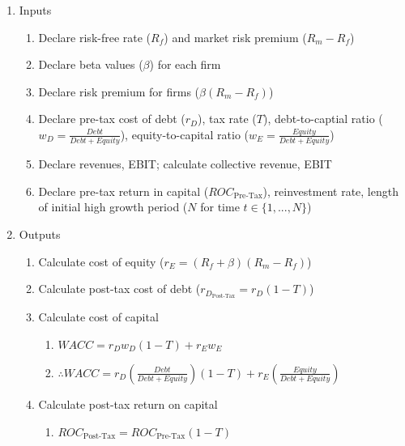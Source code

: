 \documentclass[11pt, english]{article}
\begin{document}
	\begin{enumerate}
	\setlength\itemsep{0cm}
                \item Inputs
                \begin{enumerate}
                        \item Declare risk-free rate ($R_f$) and market risk premium ($R_m-R_f$)
                        \item Declare beta values ($\beta$) for each firm
                        \item Declare risk premium for firms ($\beta(R_m-R_f)$)
                        \item Declare pre-tax cost of debt ($r_D$), tax rate ($T$), debt-to-captial ratio ($w_D=\frac{Debt}{Debt+Equity}$), equity-to-capital ratio ($w_E=\frac{Equity}{Debt+Equity}$)
                        \item Declare revenues, EBIT; calculate collective revenue, EBIT
                        \item Declare pre-tax return in capital ($ROC_{\textrm{Pre-Tax}}$), reinvestment rate, length of initial high growth period ($N$ for time $t\in\{1,...,N\}$)
                \end{enumerate}
                \item Outputs
                \begin{enumerate}
                        \item Calculate cost of equity ($r_E=(R_f+\beta)(R_m-R_f)$)
                        \item Calculate post-tax cost of debt ($r_{D_{\textrm{Post-Tax}}}=r_D(1-T)$)
                        \item Calculate cost of capital
                        \begin{enumerate}
                                \item $WACC=r_Dw_D(1-T)+r_Ew_E$
                                \item $\therefore WACC=r_D\left(\frac{Debt}{Debt+Equity}\right)(1-T)+r_E\left(\frac{Equity}{Debt+Equity}\right)$
                        \end{enumerate}
                        \item Calculate post-tax return on capital
                        \begin{enumerate}
                                \item $ROC_{\textrm{Post-Tax}}=ROC_{\textrm{Pre-Tax}}(1-T)$
                        \end{enumerate}

\end{enumerate}
\end{enumerate}
\end{document}
